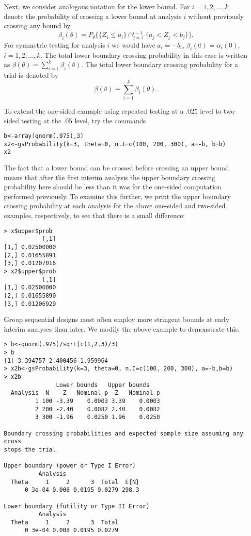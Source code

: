 Next, we consider analogous notation for the lower bound. For $i=1,2,\ldots,k$
denote the probability of crossing a lower bound at analysis $i$ without previously crossing any bound by
\begin{equation}
\beta_{i}(\theta)=P_{\theta}\{\{Z_{i}\leq a_{i}\}\cap_{j=1}^{i-1}\{a_{j}%
<Z_{j}<b_{j}\}\}.\label{beta(theta)}%
\end{equation}
For symmetric testing for analysis $i$ we would have $a_i=-b_i$, $\beta_i(0)=\alpha_i(0),$ $i=1,2,\ldots,k$. 
The total lower boundary crossing probability in this case is written as
$\beta(\theta)=%
{\textstyle\sum\limits_{i=1}^{k}}
\beta_{i}(\theta).$ 
The total lower boundary crossing probability for a trial is denoted by 
\begin{equation}
\beta(\theta)\equiv\sum_{i=1}^{k}\beta_{i}(\theta).
\end{equation} 

To extend the one-sided example using repeated testing at a .025 level to two-sided testing at the .05 level, try the commands
\bigskip
\begin{verbatim}
b<-array(qnorm(.975),3)
x2<-gsProbability(k=3, theta=0, n.I=c(100, 200, 300), a=-b, b=b)
x2
\end{verbatim}
The fact that a lower bound can be crossed before crossing an upper bound means that after the first interim analysis the upper boundary crossing probability here should be less than it was for the one-sided computation performed previously. 
To examine this further, we print the upper boundary crossing probability at each analysis for the above one-sided and two-sided examples, respectively, to see that there is a small difference:
\bigskip\begin{verbatim}
> x$upper$prob
           [,1]
[1,] 0.02500000
[2,] 0.01655891
[3,] 0.01207016
> x2$upper$prob
           [,1]
[1,] 0.02500000
[2,] 0.01655890
[3,] 0.01206929
\end{verbatim} 

Group sequential designs most often employ more stringent bounds at early interim analyses than later. We modify the above example to demonstrate this.
\bigskip\begin{verbatim}
> b<-qnorm(.975)/sqrt(c(1,2,3)/3)
> b
[1] 3.394757 2.400456 1.959964
> x2b<-gsProbability(k=3, theta=0, n.I=c(100, 200, 300), a=-b,b=b)
> x2b
               Lower bounds   Upper bounds
  Analysis  N    Z   Nominal p  Z   Nominal p
         1 100 -3.39    0.0003 3.39    0.0003
         2 200 -2.40    0.0082 2.40    0.0082
         3 300 -1.96    0.0250 1.96    0.0250

Boundary crossing probabilities and expected sample size assuming any cross 
stops the trial

Upper boundary (power or Type I Error)
          Analysis
  Theta     1     2      3  Total  E{N}
      0 3e-04 0.008 0.0195 0.0279 298.3

Lower boundary (futility or Type II Error)
          Analysis
  Theta     1     2      3  Total
      0 3e-04 0.008 0.0195 0.0279
\end{verbatim}

